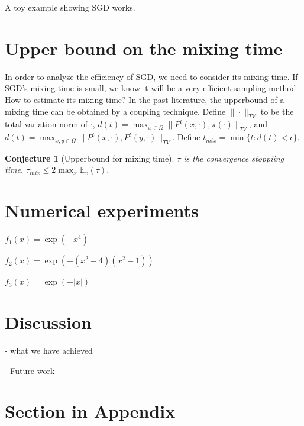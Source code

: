 \documentclass[preprint,12pt,3p]{elsarticle}
\newcommand{\E}{\mathbb{E}}
\newtheorem{conjecture}{Conjecture}
\begin{document}
A toy example showing SGD works.
\section{Upper bound on the mixing time} %
\label{sec:upper_bound_on_the_mixing_time}
In order to analyze the efficiency of SGD, we need to consider its mixing time. If SGD's mixing time is small, we know it will be a very efficient sampling method. How to estimate its mixing time? In the past literature, the upperbound of a mixing time can be obtained by a coupling technique. Define $\|\cdot\|_{TV}$ to be the total variation norm of $\cdot$, $d(t) = \max_{x\in \Omega} \|P^t(x, \cdot), \pi(\cdot)\|_{TV}$, and $\bar{d}(t) = \max_{x,y\in \Omega} \|P^t(x, \cdot), P^t(y,\cdot)\|_{TV}$. Define $t_{mix} = \min\{t:d(t) < \epsilon\}$. 
\begin{conjecture}[Upperbound for mixing time] $\tau$ is the convergence stoppiing time. $\tau_{mix} \leq 2 \max_{x} \E_{x}(\tau)$.
\end{conjecture}
\section{Numerical experiments} %
\label{sec:numerical_experiments}

$f_1(x) = \exp(-x^4)$

$f_2(x) = \exp(-(x^2 - 4)(x^2 - 1))$

$f_3(x) = \exp(-|x|)$


\section{Discussion} %
\label{sec:discussion}

- what we have achieved

- Future work

\newpage
\appendix

\section{Section in Appendix}
\label{appendix-sec1}
\end{document}
